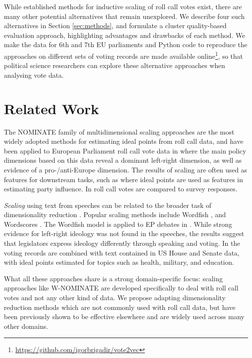 \documentclass{llncs}
\begin{document}
While established methods for inductive scaling of roll call votes exist, there are many other potential alternatives that remain unexplored. We describe four such alternatives in Section \ref{sec:methods}, and formulate a cluster quality-based evaluation approach, highlighting advantages and drawbacks of each method. We make the data for 6th and 7th EU parliaments and Python code to reproduce the approaches on different sets of voting records are made available online\footnote{\url{https://github.com/igorbrigadir/vote2vec}}, so that political science researchers can explore these alternative approaches when analysing vote data.

\section{Related Work}
\label{sec:relatedwork}

The NOMINATE \cite{poole2000congress} family of multidimensional scaling approaches are the most widely adopted methods for estimating ideal points from roll call data, and have been applied to European Parliament roll call vote data in \cite{hix2006dim} where the main policy dimensions based on this data reveal a dominant left-right dimension, as well as evidence of a pro-/anti-Europe dimension.
The results of scaling are often used as features for downstream tasks, such as \cite{mcelroy2012policy} where ideal points are used as features in estimating party influence. In \cite{gabel2007preferences} roll call votes are compared to survey responses.

\emph{Scaling} using text from speeches \cite{proksch2010position} can be related to the broader task of dimensionality reduction \cite{lowe2013there}. Popular scaling methods include Wordfish \cite{wordfish}, and Wordscores \cite{wordscores2003}. The Wordfish model is applied to EP debates in \cite{proksch2010position}. While strong evidence for left-right ideology was not found in the speeches, the results suggest that legislators express ideology differently through speaking and voting. In \cite{GuTF} the voting records are combined with text contained in US House and Senate data, with ideal points estimated for topics such as health, military, and education.

What all these approaches share is a strong domain-specific focus: scaling approaches like W-NOMINATE \cite{wnominate} are developed specifically to deal with roll call votes and not any other kind of data. We propose adapting dimensionality reduction methods which are not commonly used with roll call data, but have been previously shown to be effective elsewhere and are widely used across many other domains.
\end{document}
